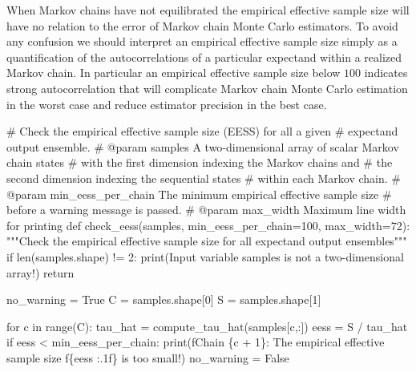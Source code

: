 \documentclass[
  letterpaper,
  DIV=11,
  numbers=noendperiod]{scrartcl}
\newenvironment{Shaded}{\begin{snugshade}}{\end{snugshade}}
\newcommand{\BuiltInTok}[1]{\textcolor[rgb]{0.00,0.23,0.31}{#1}}
\newcommand{\CommentTok}[1]{\textcolor[rgb]{0.37,0.37,0.37}{#1}}
\newcommand{\ControlFlowTok}[1]{\textcolor[rgb]{0.00,0.23,0.31}{#1}}
\newcommand{\DecValTok}[1]{\textcolor[rgb]{0.68,0.00,0.00}{#1}}
\newcommand{\KeywordTok}[1]{\textcolor[rgb]{0.00,0.23,0.31}{#1}}
\newcommand{\NormalTok}[1]{\textcolor[rgb]{0.00,0.23,0.31}{#1}}
\newcommand{\OperatorTok}[1]{\textcolor[rgb]{0.37,0.37,0.37}{#1}}
\newcommand{\SpecialCharTok}[1]{\textcolor[rgb]{0.37,0.37,0.37}{#1}}
\newcommand{\SpecialStringTok}[1]{\textcolor[rgb]{0.13,0.47,0.30}{#1}}
\newcommand{\StringTok}[1]{\textcolor[rgb]{0.13,0.47,0.30}{#1}}
\newcommand{\VariableTok}[1]{\textcolor[rgb]{0.07,0.07,0.07}{#1}}
\begin{document}
When Markov chains have not equilibrated the empirical effective sample
size will have no relation to the error of Markov chain Monte Carlo
estimators. To avoid any confusion we should interpret an empirical
effective sample size simply as a quantification of the autocorrelations
of a particular expectand within a realized Markov chain. In particular
an empirical effective sample size below \(100\) indicates strong
autocorrelation that will complicate Markov chain Monte Carlo estimation
in the worst case and reduce estimator precision in the best case.

\begin{Shaded}
\begin{Highlighting}[]
\CommentTok{\# Check the empirical effective sample size (EESS) for all a given }
\CommentTok{\# expectand output ensemble.}
\CommentTok{\# @param samples A two{-}dimensional array of scalar Markov chain states }
\CommentTok{\#                with the first dimension indexing the Markov chains and }
\CommentTok{\#                the second dimension indexing the sequential states }
\CommentTok{\#                within each Markov chain.}
\CommentTok{\# @param min\_eess\_per\_chain The minimum empirical effective sample size}
\CommentTok{\#                           before a warning message is passed.}
\CommentTok{\# @param max\_width Maximum line width for printing}
\KeywordTok{def}\NormalTok{ check\_eess(samples, min\_eess\_per\_chain}\OperatorTok{=}\DecValTok{100}\NormalTok{, max\_width}\OperatorTok{=}\DecValTok{72}\NormalTok{):}
  \CommentTok{"""Check the empirical effective sample size for all expectand }
\CommentTok{     output ensembles"""}
  \ControlFlowTok{if} \BuiltInTok{len}\NormalTok{(samples.shape) }\OperatorTok{!=} \DecValTok{2}\NormalTok{:}
    \BuiltInTok{print}\NormalTok{(}\StringTok{\textquotesingle{}Input variable \textasciigrave{}samples\textasciigrave{} is not a two{-}dimensional array!\textquotesingle{}}\NormalTok{)}
    \ControlFlowTok{return}
  
\NormalTok{  no\_warning }\OperatorTok{=} \VariableTok{True}
\NormalTok{  C }\OperatorTok{=}\NormalTok{ samples.shape[}\DecValTok{0}\NormalTok{]}
\NormalTok{  S }\OperatorTok{=}\NormalTok{ samples.shape[}\DecValTok{1}\NormalTok{]}
  
  \ControlFlowTok{for}\NormalTok{ c }\KeywordTok{in} \BuiltInTok{range}\NormalTok{(C):}
\NormalTok{    tau\_hat }\OperatorTok{=}\NormalTok{ compute\_tau\_hat(samples[c,:])}
\NormalTok{    eess }\OperatorTok{=}\NormalTok{ S }\OperatorTok{/}\NormalTok{ tau\_hat}
    \ControlFlowTok{if}\NormalTok{ eess }\OperatorTok{\textless{}}\NormalTok{ min\_eess\_per\_chain:}
      \BuiltInTok{print}\NormalTok{(}\SpecialStringTok{f\textquotesingle{}Chain }\SpecialCharTok{\{}\NormalTok{c }\OperatorTok{+} \DecValTok{1}\SpecialCharTok{\}}\SpecialStringTok{: The empirical effective sample size \textquotesingle{}}
            \SpecialStringTok{f\textquotesingle{}}\SpecialCharTok{\{}\NormalTok{eess }\SpecialCharTok{:.1f\}}\SpecialStringTok{ is too small!\textquotesingle{}}\NormalTok{)}
\NormalTok{      no\_warning }\OperatorTok{=} \VariableTok{False}
  

\end{Highlighting}
\end{Shaded}
\end{document}
